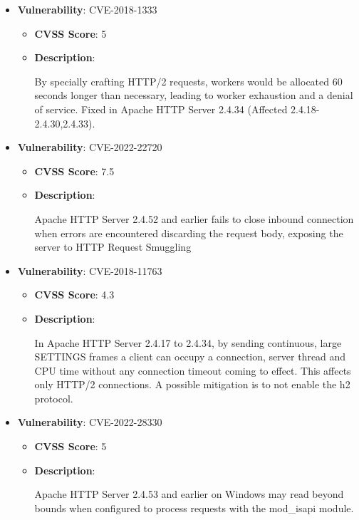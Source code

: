 \documentclass{article}
\begin{document}
\begin{itemize}
        \item \textbf{Vulnerability}: CVE-2018-1333
        \begin{itemize}
            \item \textbf{CVSS Score}:  5 
            \item \textbf{Description}:
            \parbox[t]{0.9\linewidth}{
                \ttfamily By specially crafting HTTP/2 requests, workers would be allocated 60 seconds longer than necessary, leading to worker exhaustion and a denial of service. Fixed in Apache HTTP Server 2.4.34 (Affected 2.4.18-2.4.30,2.4.33).
            }
        \end{itemize}
    
        \item \textbf{Vulnerability}: CVE-2022-22720
        \begin{itemize}
            \item \textbf{CVSS Score}:  7.5 
            \item \textbf{Description}:
            \parbox[t]{0.9\linewidth}{
                \ttfamily Apache HTTP Server 2.4.52 and earlier fails to close inbound connection when errors are encountered discarding the request body, exposing the server to HTTP Request Smuggling
            }
        \end{itemize}
    
        \item \textbf{Vulnerability}: CVE-2018-11763
        \begin{itemize}
            \item \textbf{CVSS Score}:  4.3 
            \item \textbf{Description}:
            \parbox[t]{0.9\linewidth}{
                \ttfamily In Apache HTTP Server 2.4.17 to 2.4.34, by sending continuous, large SETTINGS frames a client can occupy a connection, server thread and CPU time without any connection timeout coming to effect. This affects only HTTP/2 connections. A possible mitigation is to not enable the h2 protocol.
            }
        \end{itemize}
    
        \item \textbf{Vulnerability}: CVE-2022-28330
        \begin{itemize}
            \item \textbf{CVSS Score}:  5 
            \item \textbf{Description}:
            \parbox[t]{0.9\linewidth}{
                \ttfamily Apache HTTP Server 2.4.53 and earlier on Windows may read beyond bounds when configured to process requests with the mod\_isapi module.
            }
        \end{itemize}
    

\end{itemize}
\end{document}
